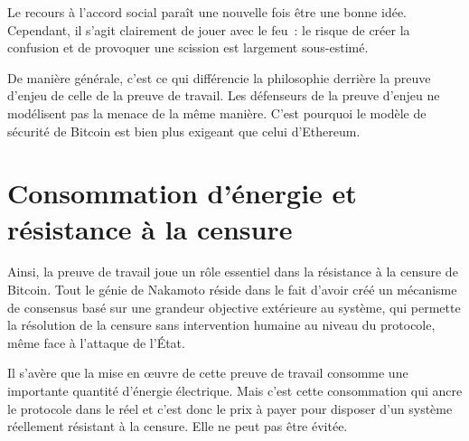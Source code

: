Le recours à l'accord social paraît une nouvelle fois être une bonne idée. Cependant, il s'agit clairement de jouer avec le feu~: le risque de créer la confusion et de provoquer une scission est largement sous-estimé.

De manière générale, c'est ce qui différencie la philosophie derrière la preuve d'enjeu de celle de la preuve de travail. Les défenseurs de la preuve d'enjeu ne modélisent pas la menace de la même manière. C'est pourquoi le modèle de sécurité de Bitcoin est bien plus exigeant que celui d'Ethereum.

%


\section*{Consommation d'énergie et résistance à la censure}

Ainsi, la preuve de travail joue un rôle essentiel dans la résistance à la censure de Bitcoin. Tout le génie de Nakamoto réside dans le fait d'avoir créé un mécanisme de consensus basé sur une grandeur objective extérieure au système, qui permette la résolution de la censure sans intervention humaine au niveau du protocole, même face à l'attaque de l'État.

Il s'avère que la mise en œuvre de cette preuve de travail consomme une importante quantité d'énergie électrique. Mais c'est cette consommation qui ancre le protocole dans le réel et c'est donc le prix à payer pour disposer d'un système réellement résistant à la censure. Elle ne peut pas être évitée.

